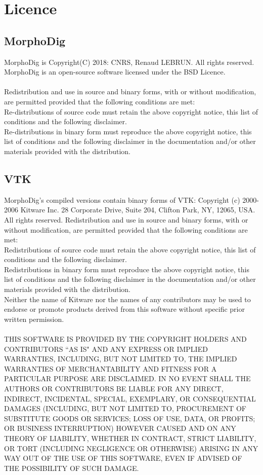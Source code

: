\chapter{Licence}
    \minitoc
		\section{MorphoDig}
MorphoDig is Copyright(C) 2018: CNRS, Renaud LEBRUN. All rights reserved.
	MorphoDig is an open-source software licensed under the BSD Licence.\\\\

Redistribution and use in source and binary forms, with or without modification, are permitted provided that the following conditions are met:\\

    Re-distributions of source code must retain the above copyright notice, this list of conditions and the following disclaimer.
		\\

    Re-distributions in binary form must reproduce the above copyright notice, this list of conditions and the following disclaimer in the documentation and/or other materials provided with the distribution.


    \section{VTK}
  MorphoDig's compiled versions contain binary forms of VTK: Copyright (c) 2000-2006 Kitware Inc. 28 
Corporate Drive, Suite 204, Clifton Park, NY, 12065, USA. All rights reserved. Redistribution and use 
in source and binary forms, with or without modification, are permitted provided that the following 
conditions are met:\\
    Redistributions of source code must retain the above copyright notice, this list of conditions and 
the following disclaimer.\\
    Redistributions in binary form must reproduce the above copyright notice, this list of conditions 
and the following disclaimer in the documentation and/or other materials provided with the distribution.\\
    Neither the name of Kitware nor the names of any contributors may be used to endorse or promote products derived from this software without specific prior written permission.\\\\
THIS SOFTWARE IS PROVIDED BY THE COPYRIGHT HOLDERS AND CONTRIBUTORS ``AS IS" AND ANY 
EXPRESS OR IMPLIED WARRANTIES, INCLUDING, BUT NOT LIMITED TO, THE IMPLIED WARRANTIES 
OF MERCHANTABILITY AND FITNESS FOR A PARTICULAR PURPOSE ARE DISCLAIMED. IN NO EVENT 
SHALL THE AUTHORS OR CONTRIBUTORS BE LIABLE FOR ANY DIRECT, INDIRECT, INCIDENTAL, SPECIAL, 
EXEMPLARY, OR CONSEQUENTIAL DAMAGES (INCLUDING, BUT NOT LIMITED TO, PROCUREMENT OF 
SUBSTITUTE GOODS OR SERVICES; LOSS OF USE, DATA, OR PROFITS; OR BUSINESS INTERRUPTION) 
HOWEVER CAUSED AND ON ANY THEORY OF LIABILITY, WHETHER IN CONTRACT, STRICT LIABILITY, 
OR TORT (INCLUDING NEGLIGENCE OR OTHERWISE) ARISING IN ANY WAY OUT OF THE USE OF THIS 
SOFTWARE, EVEN IF ADVISED OF THE POSSIBILITY OF SUCH DAMAGE.

